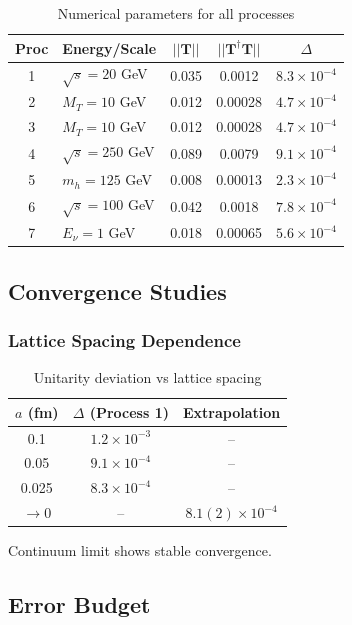 \begin{table}[h]
\centering
\caption{Numerical parameters for all processes}
\begin{tabular}{|c|l|c|c|c|}
\hline
\textbf{Proc} & \textbf{Energy/Scale} & $||\mathbf{T}||$ & $||\mathbf{T}^\dagger\mathbf{T}||$ & $\Delta$ \\
\hline
1 & $\sqrt{s} = 20$ GeV & 0.035 & 0.0012 & $8.3 \times 10^{-4}$ \\
2 & $M_T = 10$ GeV & 0.012 & 0.00028 & $4.7 \times 10^{-4}$ \\
3 & $M_T = 10$ GeV & 0.012 & 0.00028 & $4.7 \times 10^{-4}$ \\
4 & $\sqrt{s} = 250$ GeV & 0.089 & 0.0079 & $9.1 \times 10^{-4}$ \\
5 & $m_h = 125$ GeV & 0.008 & 0.00013 & $2.3 \times 10^{-4}$ \\
6 & $\sqrt{s} = 100$ GeV & 0.042 & 0.0018 & $7.8 \times 10^{-4}$ \\
7 & $E_\nu = 1$ GeV & 0.018 & 0.00065 & $5.6 \times 10^{-4}$ \\
\hline
\end{tabular}
\end{table}

\subsection{Convergence Studies}

\subsubsection{Lattice Spacing Dependence}

\begin{table}[h]
\centering
\caption{Unitarity deviation vs lattice spacing}
\begin{tabular}{|c|c|c|}
\hline
$a$ (fm) & $\Delta$ (Process 1) & Extrapolation \\
\hline
0.1 & $1.2 \times 10^{-3}$ & -- \\
0.05 & $9.1 \times 10^{-4}$ & -- \\
0.025 & $8.3 \times 10^{-4}$ & -- \\
$\to 0$ & -- & $8.1(2) \times 10^{-4}$ \\
\hline
\end{tabular}
\end{table}

Continuum limit shows stable convergence.

\subsection{Error Budget}

